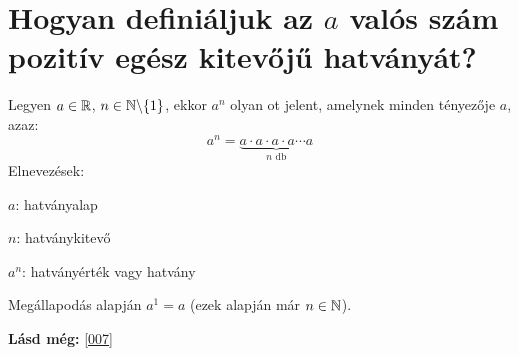 
\section{Hogyan definiáljuk az \texorpdfstring{$a$}{a} valós szám pozitív egész
kitevőjű hatványát?}
\label{006}

\begin{defin}[Hatvány]
\label{def:power}
Legyen $a \in \mathbb{R}$, $n \in \mathbb{N} \backslash \{1\}$, ekkor $a^n$ olyan
ot jelent, amelynek minden tényezője $a$, azaz:
\[
a^n = \underbrace{a \cdot a \cdot a \cdot a \cdots{ } a}_{n \text{ db}}
\]
Elnevezések:

$a$: hatványalap

$n$: hatványkitevő

$a^n$: hatványérték vagy hatvány

Megállapodás alapján $a^1 = a$ (ezek alapján már $n \in \mathbb{N}$).
\end{defin}

\textbf{Lásd még:} \ref{007}
